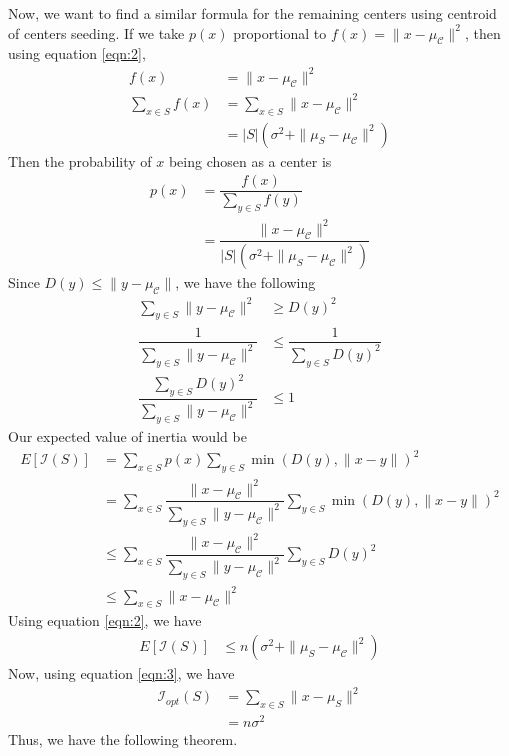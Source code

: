 \documentclass[twoside, 11pt]{article}
\newcommand{\C}{\mathcal{C}}
\newcommand{\I}{\mathcal{I}}
\begin{document}
	Now, we want to find a similar formula for the remaining centers using centroid of centers seeding. If we take $p(x)$ proportional to $f(x)=\|x-\mu_{\C}\|^2$, then using equation \eqref{eqn:2},
		\begin{align*}
			f(x) & = \|x-\mu_{\C}\|^2\\
			\sum_{x\in S}f(x) 
				& = \sum_{x\in S}\|x-\mu_{\C}\|^2\\
				& = |S|(\sigma^2+\|\mu_S-\mu_{\C}\|^2)
		\end{align*}
	Then the probability of $x$ being chosen as a center is
		\begin{align*}
			p(x) & = \dfrac{f(x)}{\sum_{y\in S}f(y)}\\
				 & = \dfrac{\|x-\mu_{\C}\|^2}{|S|(\sigma^2+\|\mu_{S}-\mu_{\C}\|^2)}
		\end{align*}
	Since $D(y)\leq \|y-\mu_{\C}\|$, we have the following
		\begin{align*}
			\sum_{y\in S}\|y-\mu_{\C}\|^2 & \geq D(y)^2\\
			\dfrac{1}{\sum_{y\in S}\|y-\mu_{\C}\|^2} & \leq \dfrac{1}{\sum_{y\in S}D(y)^2}\\
			\dfrac{\sum_{y\in S}D(y)^2}{\sum_{y\in S}\|y-\mu_{\C}\|^2} & \leq 1
		\end{align*}
	Our expected value of inertia would be
		\begin{align*}
			E[\I(S)] & = \sum_{x\in S}p(x)\sum_{y\in S}\min(D(y),\|x-y\|)^2\\
					   & = \sum_{x\in S}\dfrac{\|x-\mu_{\C}\|^2}{\sum_{y\in S}\|y-\mu_{\C}\|^2}\sum_{y\in S}\min(D(y),\|x-y\|)^2\\
					   & \leq \sum_{x\in S}\dfrac{\|x-\mu_{\C}\|^2}{\sum_{y\in S}\|y-\mu_{\C}\|^2}\sum_{y\in S}D(y)^2\\
					   & \leq \sum_{x\in S}\|x-\mu_{\C}\|^2
		\end{align*}
	Using equation \eqref{eqn:2}, we have
		\begin{align*}
			E[\I(S)] & \leq n(\sigma^2+\|\mu_S-\mu_{\C}\|^2)
		\end{align*}
	Now, using equation \eqref{eqn:3}, we have
		\begin{align*}
			\I_{opt}(S) & = \sum_{x\in S}\|x-\mu_{S}\|^2\\
						  & = n\sigma^2
		\end{align*}
	Thus, we have the following theorem.
\end{document}
